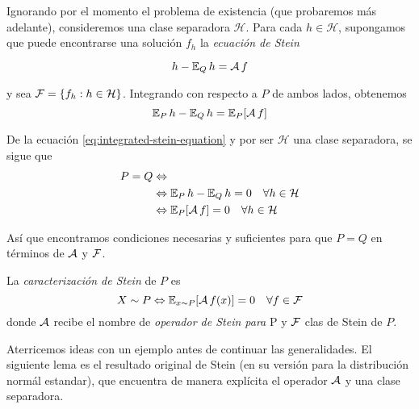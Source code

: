 \documentclass[main.tex]{subfiles}
\begin{document}
Ignorando por el momento el problema de existencia (que probaremos más adelante), consideremos una clase separadora $\mathcal{H}$. Para cada $h \in \mathcal{H}$, supongamos que puede encontrarse una solución $f_h$ la \textit{ecuación de Stein}

\begin{equation}\label{eq:stein-equation}
    h - \operatorname{\mathbb{E}}_Qh = \operatorname{\mathcal{A}} f
\end{equation}

y sea $\operatorname{\mathcal{F}} = \{f_h: h \in \mathcal{H}\}$. Integrando con respecto a $P$ de ambos lados, obtenemos
\begin{equation}\label{eq:integrated-stein-equation}
    \operatorname{\mathbb{E}}_Ph - \operatorname{\mathbb{E}}_Qh = \operatorname{\mathbb{E}}_P[\operatorname{\mathcal{A}} f]
\end{equation}

De la ecuación \eqref{eq:integrated-stein-equation} y por ser $\mathcal{H}$ una clase separadora, se sigue que 
\begin{align*}
    P = Q &\Leftrightarrow \\
    &\Leftrightarrow \operatorname{\mathbb{E}}_Ph - \operatorname{\mathbb{E}}_Qh = 0 \quad \forall h \in \mathcal{H}  \\
    &\Leftrightarrow \operatorname{\mathbb{E}}_P[\operatorname{\mathcal{A}} f]= 0 \quad \forall h \in \mathcal{H}
\end{align*}

Así que encontramos condiciones necesarias y suficientes para que $P=Q$ en términos de $\operatorname{\mathcal{A}}$ y $\operatorname{\mathcal{F}}$. 

\begin{definition}
    La \textit{caracterización de Stein} de $P$ es
    \begin{equation*}
        X\sim P \Leftrightarrow \operatorname{\mathbb{E}}_{x\sim P}[\operatorname{\mathcal{A}} f(x)]= 0 \quad \forall f \in \operatorname{\mathcal{F}}
    \end{equation*}
    donde $\operatorname{\mathcal{A}}$ recibe el nombre de \textit{operador de Stein para } P y $\operatorname{\mathcal{F}}$ {clas de Stein} de $P$.
\end{definition}

Aterricemos ideas con un ejemplo antes de continuar las generalidades. El siguiente lema es el resultado original de Stein (en su versión para la distribución normál estandar), que encuentra de manera explícita el operador $\operatorname{\mathcal{A}}$  y una clase separadora. 
\end{document}
